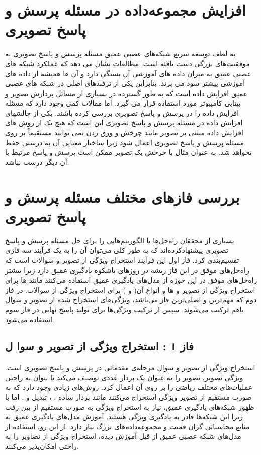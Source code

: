 \section{افزایش مجموعه‌داده در مسئله پرسش و پاسخ تصویری}
به لطف توسعه سریع شبکه‌های عصبی عمیق مسئله پرسش و پاسخ تصویری به موفقیت‌های بزرگی دست یافته است. مطالعات نشان می دهد که عملکرد شبکه های عصبی عمیق به میزان داده های آموزشی آن بستگی دارد و آن ها همیشه از داده های آموزشی پیشتر سود می برند. بنابراین یکی از ترفندهای اصلی در شبکه های عصبی عمیق افزایش داده است که به طور گسترده در بسیاری از مسائل پردازش تصویر و بینایی کامپیوتر مورد استفاده قرار می گیرد. اما مقالات کمی وجود دارد که مسئله افزایش داده را در پرسش و پاسخ تصویری بررسی کرده باشند. یکی از چالشهای افزایش داده در مسئله پرسش و پاسخ تصویری این است که هیچ یک از روش های افزایش داده  مبتنی بر تصویر مانند چرخش و ورق زدن نمی توانند مستقیماً بر روی مسئله پرسش و پاسخ تصویری اعمال شود زیرا ساختار معنایی آن به درستی حفظ نخواهد شد. به عنوان مثال با چرخش یک تصویر ممکن است پرسش و پاسخ مرتبط با آن دیگر درست نباشد.  

\section{بررسی فازهای مختلف مسئله پرسش و پاسخ تصویری}
بسیاری از محققان راه‌حل‌ها یا الگوریتم‌هایی را برای حل مسئله پرسش و پاسخ تصویری پیشنهاد‌کرده‌اند که به طور کلی می‌توان آن را به یک فرآیند سه فازی تقسیم‌بندی کرد. فاز اول این فرآیند استخراج ویژگی از تصویر و سوالات است که راه‌حل‌های موفق در این فاز ریشه در روزهای باشکوه یادگیری عمیق دارد زیرا بیشتر راه‌حل‌های موفق در این حوزه از مدل‌های یادگیری عمیق استفاده می‌کنند مانند 
 ها برای استخراج ویژگی از  تصویر و 
  ها و انواع آن(
  و
  ) برای استخراج ویژگی از سوالات. در فاز دوم که مهم‌ترین و اصلی‌ترین فاز می‌باشد، ویژگی‌های استخراج شده از تصویر و سوال باهم ترکیب می‌شوند. سپس از ترکیب ویژگی‌ها برای تولید پاسخ نهایی در فاز سوم استفاده می‌شود.
\subsection{فاز 1 : استخراج ویژگی از تصویر و سوا ل} \label{sec:extract}

		استخراج ویژگی از تصویر و سوال مرحله‌ی مقدماتی در پرسش و پاسخ تصویری است. ویژگی تصویر، تصویر را به عنوان یک بردار عددی  توصیف می‌کند تا بتوان به راحتی عملیات‌های مختلف ریاضی را بر روی آن اعمال کرد. روش‌های زیادی وجود دارد که به صورت مستقیم از تصویر ویژگی استخراج می‌کنند مانند بردار ساده 
		،
		، تبدیل
		و 
		.
		اما با ظهور شبکه‌های یادگیری عمیق، نیاز به استخراج ویژگی به صورت مستقیم از بین رفت زیرا این شبکه‌ها قادر به یادگیری ویژگی هستند. آموزش مدل‌های یادگیری عمیق به منابع محاسباتی گران قمیت و مجموعه‌داده‌های بزرگ نیاز دارد. از این رو، استفاده از مدل‌های شبکه عصبی عمیق از قبل آموزش دیده، استخراج ویژگی‌ از تصاویر را به راحتی امکان‌پذیر می‌کنند. 
		
